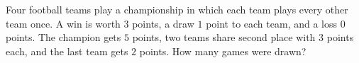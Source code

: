 Four football teams play a championship in which each team plays every other team once. A win is worth $3$ points, a draw $1$ point to each team, and a loss $0$ points. The champion gets $5$ points, two teams share second place with $3$ points each, and the last team gets $2$ points. How many games were drawn?
